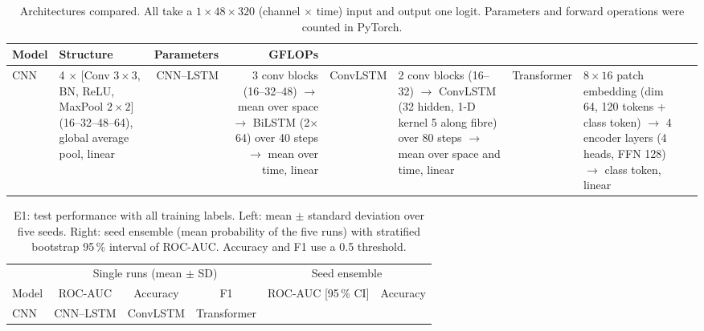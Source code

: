 \begin{table}[h]
\caption{Architectures compared. All take a $1\times48\times320$ (channel $\times$ time) input and output one logit. Parameters and forward operations were counted in PyTorch.}\label{tab:arch}
\centering\footnotesize\setlength{\tabcolsep}{3pt}
\begin{tabular}{>{\raggedright}p{2.2cm}>{\raggedright}p{8.3cm}rr}
\toprule
Model & Structure & Parameters & GFLOPs\\
\midrule
CNN & 4 $\times$ [Conv $3\times3$, BN, ReLU, MaxPool $2\times2$] (16--32--48--64), global average pool, linear & %
CNN--LSTM & 3 conv blocks (16--32--48) $\rightarrow$ mean over space $\rightarrow$ BiLSTM (2$\times$64) over 40 steps $\rightarrow$ mean over time, linear & %
ConvLSTM & 2 conv blocks (16--32) $\rightarrow$ ConvLSTM (32 hidden, 1-D kernel 5 along fibre) over 80 steps $\rightarrow$ mean over space and time, linear & %
Transformer & $8\times16$ patch embedding (dim 64, 120 tokens + class token) $\rightarrow$ 4 encoder layers (4 heads, FFN 128) $\rightarrow$ class token, linear & %
\bottomrule
\end{tabular}
\end{table}

\begin{table}[h]
\caption{E1: test performance with all training labels. Left: mean $\pm$ standard deviation over five seeds. Right: seed ensemble (mean probability of the five runs) with stratified bootstrap 95\,\% interval of ROC-AUC. Accuracy and F1 use a 0.5 threshold.}\label{tab:main}
\centering\footnotesize\setlength{\tabcolsep}{3pt}
\begin{tabular}{lccc|cc}
\toprule
 & \multicolumn{3}{c|}{Single runs (mean $\pm$ SD)} & \multicolumn{2}{c}{Seed ensemble}\\
Model & ROC-AUC & Accuracy & F1 & ROC-AUC [95\,\% CI] & Accuracy\\
\midrule
CNN & %
CNN--LSTM & %
ConvLSTM & %
Transformer & %
\bottomrule
\end{tabular}
\end{table}

